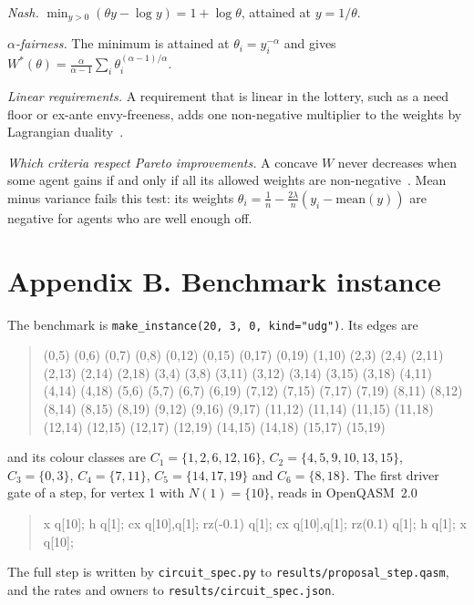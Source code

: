 \documentclass[11pt,a4paper]{article}
\begin{document}
\noindent\emph{Nash.} $\min_{y>0}(\theta y-\log y)=1+\log\theta$, attained at $y=1/\theta$.

\noindent\emph{$\alpha$-fairness.} The minimum is attained at $\theta_i=y_i^{-\alpha}$ and gives
$W^*(\theta)=\frac{\alpha}{\alpha-1}\sum_i\theta_i^{(\alpha-1)/\alpha}$.

\noindent\emph{Linear requirements.} A requirement that is linear in the lottery, such as a need
floor or ex-ante envy-freeness, adds one non-negative multiplier to the weights by Lagrangian
duality~\cite{boyd2004convex}.

\noindent\emph{Which criteria respect Pareto improvements.} A concave $W$ never decreases when some
agent gains if and only if all its allowed weights are non-negative~\cite{rockafellar1970convex}. Mean
minus variance fails this test: its weights $\theta_i=\frac1n-\frac{2\lambda}n(y_i-\mathrm{mean}(y))$
are negative for agents who are well enough off.

\section*{Appendix B. Benchmark instance}

The benchmark is \texttt{make\_instance(20, 3, 0, kind="udg")}. Its edges are
\begin{quote}\footnotesize\ttfamily\raggedright
(0,5) (0,6) (0,7) (0,8) (0,12) (0,15) (0,17) (0,19) (1,10) (2,3) (2,4) (2,11) (2,13) (2,14)
(2,18) (3,4) (3,8) (3,11) (3,12) (3,14) (3,15) (3,18) (4,11) (4,14) (4,18) (5,6) (5,7) (6,7)
(6,19) (7,12) (7,15) (7,17) (7,19) (8,11) (8,12) (8,14) (8,15) (8,19) (9,12) (9,16) (9,17)
(11,12) (11,14) (11,15) (11,18) (12,14) (12,15) (12,17) (12,19) (14,15) (14,18) (15,17) (15,19)
\end{quote}
and its colour classes are $C_1=\{1,2,6,12,16\}$, $C_2=\{4,5,9,10,13,15\}$, $C_3=\{0,3\}$,
$C_4=\{7,11\}$, $C_5=\{14,17,19\}$ and $C_6=\{8,18\}$. The first driver gate of a step, for vertex 1
with $N(1)=\{10\}$, reads in OpenQASM~2.0~\cite{cross2017open}
\begin{quote}\footnotesize\ttfamily\raggedright
x q[10]; h q[1]; cx q[10],q[1]; rz(-0.1) q[1]; cx q[10],q[1]; rz(0.1) q[1]; h q[1]; x q[10];
\end{quote}
The full step is written by \texttt{circuit\_spec.py} to \texttt{results/proposal\_step.qasm}, and the
rates and owners to \texttt{results/circuit\_spec.json}.



\end{document}
